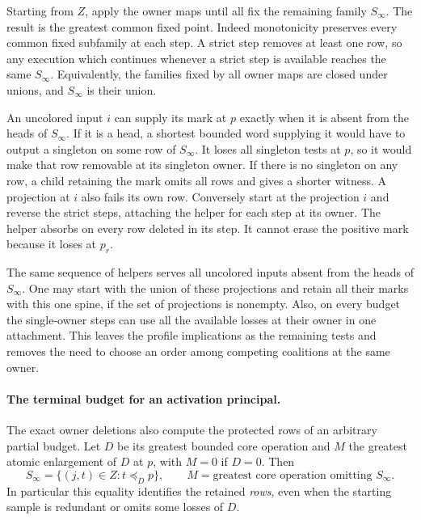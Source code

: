 Starting from $Z$, apply the owner maps until all fix the remaining
family $S_\infty$. The result is the greatest common fixed point.
Indeed monotonicity preserves every common fixed subfamily at each
step. A strict step removes at least one row, so any execution
which continues whenever a strict step is available reaches the
same $S_\infty$. Equivalently, the families fixed by all owner
maps are closed under unions, and $S_\infty$ is their union.

An uncolored input $i$ can supply its mark at $p$ exactly when it
is absent from the heads of $S_\infty$. If it is a head, a shortest
bounded word supplying it would have to output a singleton on some
row of $S_\infty$. It loses all singleton tests at $p$, so it would
make that row removable at its singleton owner. If there is no
singleton on any row, a child retaining the mark omits all rows
and gives a shorter witness. A projection at $i$ also fails its own
row. Conversely start at the projection $i$ and reverse the strict
steps, attaching the helper for each step at its owner. The helper
absorbs on every row deleted in its step. It cannot erase the
positive mark because it loses at $p_r$.

The same sequence of helpers serves all uncolored inputs absent
from the heads of $S_\infty$. One may start with the union of these
projections and retain all their marks with this one spine, if
the set of projections is nonempty. Also, on every budget the
single-owner steps can use all the available losses at their owner
in one attachment. This leaves the profile implications as the
remaining tests and removes the need to choose an order among
competing coalitions at the same owner.

\paragraph{The terminal budget for an activation principal.}
The exact owner deletions also compute the protected
rows of an arbitrary partial budget. Let $D$ be its
greatest bounded core operation and $M$ the greatest
atomic enlargement of $D$ at $p$, with $M=0$ if
$D=0$. Then
\[
 S_\infty=\{(j,t)\in Z:t\preceq_D p\},
 \qquad
 M=\text{greatest core operation omitting }S_\infty .
\]
In particular this equality identifies the retained
\emph{rows}, even when the starting sample is
redundant or omits some losses of $D$.

